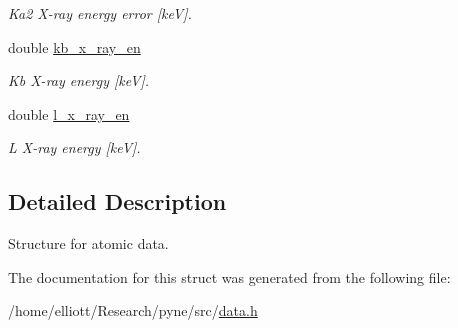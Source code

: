 \begin{DoxyCompactItemize}
\begin{DoxyCompactList}\small\item\em Ka2 X-\/ray energy error \mbox{[}ke\-V\mbox{]}. \end{DoxyCompactList}\item 
\hypertarget{structpyne_1_1atomic_aa93013778d65dc071c27564449e351de}{double \hyperlink{structpyne_1_1atomic_aa93013778d65dc071c27564449e351de}{kb\-\_\-x\-\_\-ray\-\_\-en}}\label{structpyne_1_1atomic_aa93013778d65dc071c27564449e351de}

\begin{DoxyCompactList}\small\item\em Kb X-\/ray energy \mbox{[}ke\-V\mbox{]}. \end{DoxyCompactList}\item 
\hypertarget{structpyne_1_1atomic_a43e9e36e9b5bd8e4e77ffbe86b5ef28d}{double \hyperlink{structpyne_1_1atomic_a43e9e36e9b5bd8e4e77ffbe86b5ef28d}{l\-\_\-x\-\_\-ray\-\_\-en}}\label{structpyne_1_1atomic_a43e9e36e9b5bd8e4e77ffbe86b5ef28d}

\begin{DoxyCompactList}\small\item\em L X-\/ray energy \mbox{[}ke\-V\mbox{]}. \end{DoxyCompactList}\end{DoxyCompactItemize}


\subsection{Detailed Description}
Structure for atomic data. 

The documentation for this struct was generated from the following file\-:\begin{DoxyCompactItemize}
\item 
/home/elliott/\-Research/pyne/src/\hyperlink{data_8h}{data.\-h}\end{DoxyCompactItemize}
